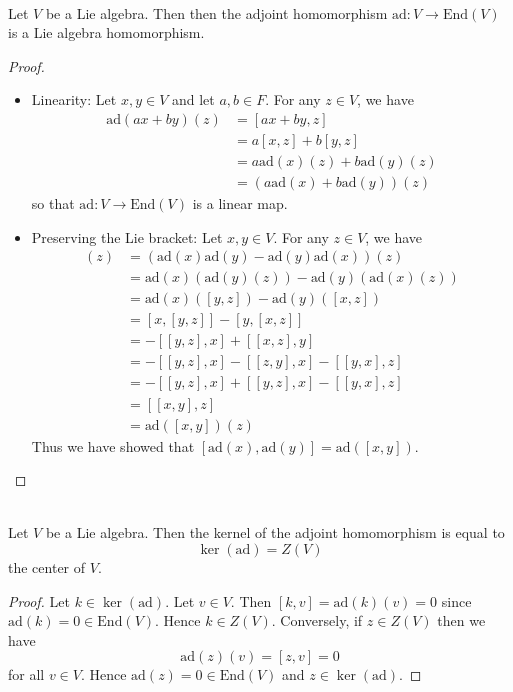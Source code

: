 \documentclass[a4paper]{article}
\begin{document}
\begin{lmm}{}{} \\Let $V$ be a Lie algebra. Then then the adjoint homomorphism $\text{ad}:V\to\text{End}(V)$ is a Lie algebra homomorphism. 
\begin{proof}~\\
\begin{itemize}
\item Linearity: Let $x,y\in V$ and let $a,b\in F$. For any $z\in V$, we have
\begin{align*}
\text{ad}(ax+by)(z)&=[ax+by,z]\\
&=a[x,z]+b[y,z]\\
&=a\text{ad}(x)(z)+b\text{ad}(y)(z)\\
&=\left(a\text{ad}(x)+b\text{ad}(y)\right)(z)
\end{align*}
so that $\text{ad}:V\to\text{End}(V)$ is a linear map. 
\item Preserving the Lie bracket: Let $x,y\in V$. For any $z\in V$, we have
\begin{align*}
[\text{ad}(x),\text{ad}(y)](z)&=\left(\text{ad}(x)\text{ad}(y)-\text{ad}(y)\text{ad}(x)\right)(z)\\
&=\text{ad}(x)\left(\text{ad}(y)(z)\right)-\text{ad}(y)\left(\text{ad}(x)(z)\right)\\
&=\text{ad}(x)([y,z])-\text{ad}(y)([x,z])\\
&=[x,[y,z]]-[y,[x,z]]\\
&=-[[y,z],x]+[[x,z],y]\\
&=-[[y,z],x]-[[z,y],x]-[[y,x],z]\\
&=-[[y,z],x]+[[y,z],x]-[[y,x],z]\\
&=[[x,y],z]\\
&=\text{ad}([x,y])(z)
\end{align*}
Thus we have showed that $[\text{ad}(x),\text{ad}(y)]=\text{ad}([x,y])$. 
\end{itemize}
\end{proof}
\end{lmm}

\begin{lmm}{}{} \\Let $V$ be a Lie algebra. Then the kernel of the adjoint homomorphism is equal to $$\ker(\text{ad})=Z(V)$$ the center of $V$. 
\begin{proof}
Let $k\in\ker(\text{ad})$. Let $v\in V$. Then $[k,v]=\text{ad}(k)(v)=0$ since $\text{ad}(k)=0\in\text{End}(V)$. Hence $k\in Z(V)$. Conversely, if $z\in Z(V)$ then we have $$\text{ad}(z)(v)=[z,v]=0$$ for all $v\in V$. Hence $\text{ad}(z)=0\in\text{End}(V)$ and $z\in\ker(\text{ad})$. 
\end{proof}
\end{lmm}
\end{document}
